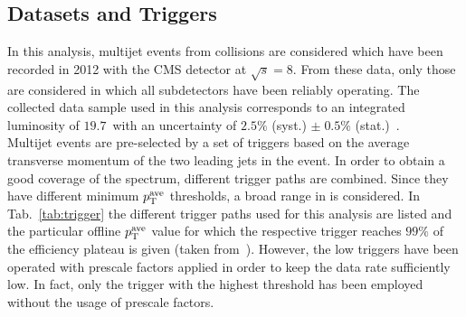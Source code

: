 \subsection{Datasets and Triggers}
\label{subsec:jer_samples_and_trigger}
\begin{table}[!tp]
\centering
\caption{Trigger paths with \ptave thresholds at which the trigger efficiency reaches the $99\%$ efficiency plateau. Thresholds are given for PFCHS jets.}
\label{tab:trigger}
\end{table}  
In this analysis, multijet events from \pp collisions are considered which have been recorded in 2012 with the CMS detector at $\sqrt{s}=8$\tev. From these data, only those are considered in which all subdetectors have been reliably operating. The collected data sample used in this analysis corresponds to an integrated luminosity of $19.7$~\fbinv with an uncertainty of $2.5\%$ (syst.)  $\pm \; 0.5\%$ (stat.)~\cite{CMS-PAS-LUM-13-001}. \\
Multijet events are pre-selected by a set of triggers based on the average transverse momentum of the two leading jets in the event. In order to obtain a good coverage of the \ptave spectrum, different trigger paths are combined. Since they have different minimum $p_{\text{T}}^\mathrm{ave}$ thresholds, a broad range in \ptave is considered. In Tab.~\ref{tab:trigger} the different trigger paths used for this analysis are listed and the particular offline $p_{\text{T}}^\mathrm{ave}$ value for which the respective trigger reaches $99\%$ of the efficiency plateau is given (taken from~\cite{website:HamburgCalib}). However, the low \ptave triggers have been operated with prescale factors applied in order to keep the data rate sufficiently low. In fact, only the trigger with the highest \ptave threshold has been employed without the usage of prescale factors. \\
